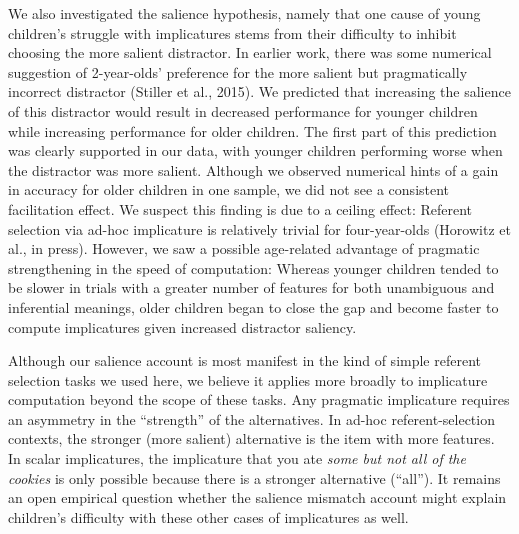 \documentclass[mask,man]{apa6}
\theoremstyle{definition}
\theoremstyle{definition}
\theoremstyle{definition}
\theoremstyle{remark}
\begin{document}
We also investigated the salience hypothesis, namely that one cause of
young children's struggle with implicatures stems from their difficulty
to inhibit choosing the more salient distractor. In earlier work, there
was some numerical suggestion of 2-year-olds' preference for the more
salient but pragmatically incorrect distractor (Stiller et al., 2015).
We predicted that increasing the salience of this distractor would
result in decreased performance for younger children while increasing
performance for older children. The first part of this prediction was
clearly supported in our data, with younger children performing worse
when the distractor was more salient. Although we observed numerical
hints of a gain in accuracy for older children in one sample, we did not
see a consistent facilitation effect. We suspect this finding is due to
a ceiling effect: Referent selection via ad-hoc implicature is
relatively trivial for four-year-olds (Horowitz et al., in press).
However, we saw a possible age-related advantage of pragmatic
strengthening in the speed of computation: Whereas younger children
tended to be slower in trials with a greater number of features for both
unambiguous and inferential meanings, older children began to close the
gap and become faster to compute implicatures given increased distractor
saliency.

Although our salience account is most manifest in the kind of simple
referent selection tasks we used here, we believe it applies more
broadly to implicature computation beyond the scope of these tasks. Any
pragmatic implicature requires an asymmetry in the \enquote{strength} of
the alternatives. In ad-hoc referent-selection contexts, the stronger
(more salient) alternative is the item with more features. In scalar
implicatures, the implicature that you ate \emph{some but not all of the
cookies} is only possible because there is a stronger alternative
(\enquote{all}). It remains an open empirical question whether the
salience mismatch account might explain children's difficulty with these
other cases of implicatures as well.
\end{document}
